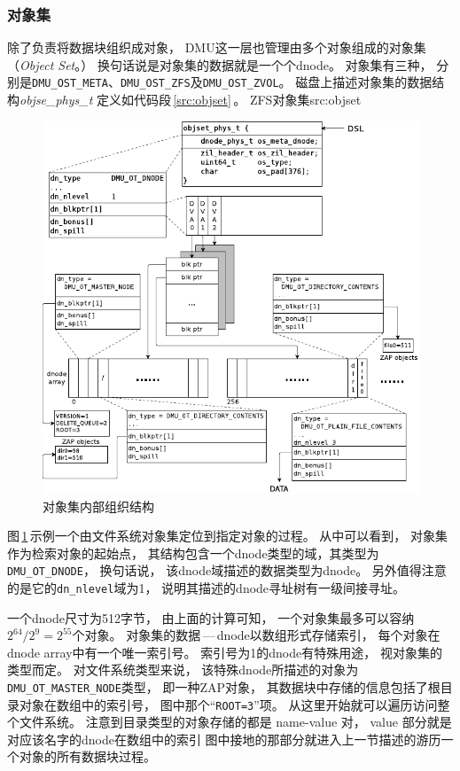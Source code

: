 \subsubsection{对象集}
除了负责将数据块组织成对象，
DMU这一层也管理由多个对象组成的对象集（{\em Object Set}。）
换句话说是对象集的数据就是一个个dnode。
对象集有三种，
分别是\verb|DMU_OST_META|、\verb|DMU_OST_ZFS|及\verb|DMU_OST_ZVOL|。
磁盘上描述对象集的数据结构{\em objse\_phys\_t}
定义如代码段\,\ref{src:objset}\,。
\newpage
{}
              {ZFS对象集}{src:objset}

\begin{figure}[!ht]
  \centering
  \includegraphics[width=\textwidth]{fig/zfs_objset.pdf}
  \caption{对象集内部组织结构}\label{fig:zfs_objset}
\end{figure}

图\,\ref{fig:zfs_objset}\,示例一个由文件系统对象集定位到指定对象的过程。
从中可以看到，
对象集作为检索对象的起始点，
其结构包含一个dnode类型的域，其类型为\verb|DMU_OT_DNODE|，
换句话说，
该dnode域描述的数据类型为dnode。
另外值得注意的是它的\verb|dn_nlevel|域为1，
说明其描述的dnode寻址树有一级间接寻址。


一个dnode尺寸为512字节，
由上面的计算可知，
一个对象集最多可以容纳$2^{64} / 2^{9} = 2^{55}$个对象。
对象集的数据\,---\,dnode以数组形式存储索引，
每个对象在dnode array中有一个唯一索引号。
索引号为1的dnode有特殊用途，
视对象集的类型而定。
对文件系统类型来说，
该特殊dnode所描述的对象为\verb|DMU_OT_MASTER_NODE|类型，
即一种ZAP对象，
其数据块中存储的信息包括了根目录对象在数组中的索引号，
图中那个``\verb|ROOT=3|''项。
从这里开始就可以遍历访问整个文件系统。
注意到目录类型的对象存储的都是 name-value 对，
value 部分就是对应该名字的dnode在数组中的索引
图中接地的那部分就进入上一节描述的游历一个对象的所有数据块过程。

